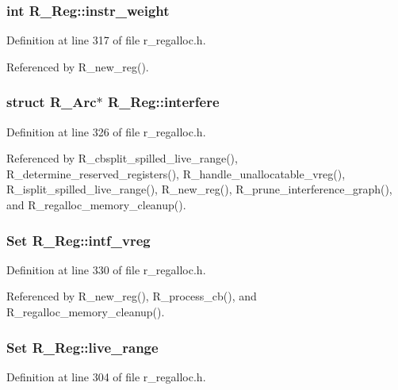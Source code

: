 \subsubsection{\setlength{\rightskip}{0pt plus 5cm}int \bf{R\_\-Reg::instr\_\-weight}}\label{structR__Reg_387afc6c12b21275b4ebdc730103fd4f}




Definition at line 317 of file r\_\-regalloc.h.

Referenced by R\_\-new\_\-reg().
\subsubsection{\setlength{\rightskip}{0pt plus 5cm}struct \bf{R\_\-Arc}$\ast$ \bf{R\_\-Reg::interfere}}\label{structR__Reg_623221ff7bedb6ee7cf4697220a78dd7}




Definition at line 326 of file r\_\-regalloc.h.

Referenced by R\_\-cbsplit\_\-spilled\_\-live\_\-range(), R\_\-determine\_\-reserved\_\-registers(), R\_\-handle\_\-unallocatable\_\-vreg(), R\_\-isplit\_\-spilled\_\-live\_\-range(), R\_\-new\_\-reg(), R\_\-prune\_\-interference\_\-graph(), and R\_\-regalloc\_\-memory\_\-cleanup().
\subsubsection{\setlength{\rightskip}{0pt plus 5cm}\bf{Set} \bf{R\_\-Reg::intf\_\-vreg}}\label{structR__Reg_597da7b4abc5012a00bc605aa8805ec2}




Definition at line 330 of file r\_\-regalloc.h.

Referenced by R\_\-new\_\-reg(), R\_\-process\_\-cb(), and R\_\-regalloc\_\-memory\_\-cleanup().
\subsubsection{\setlength{\rightskip}{0pt plus 5cm}\bf{Set} \bf{R\_\-Reg::live\_\-range}}\label{structR__Reg_9373a963121acbf1deeff9fe1f3bd3d8}




Definition at line 304 of file r\_\-regalloc.h.

